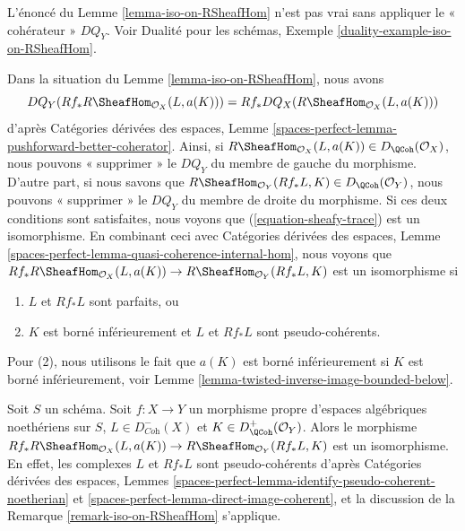 \begin{example}
\label{example-iso-on-RSheafHom}
L'énoncé du Lemme \ref{lemma-iso-on-RSheafHom} n'est pas vrai sans
appliquer le « cohérateur » $DQ_Y$. Voir
Dualité pour les schémas, Exemple \ref{duality-example-iso-on-RSheafHom}.
\end{example}

\begin{remark}
\label{remark-iso-on-RSheafHom}
Dans la situation du Lemme \ref{lemma-iso-on-RSheafHom}, nous avons
$$
DQ_Y(Rf_*R\SheafHom_{\mathcal{O}_X}(L, a(K))) =
Rf_* DQ_X(R\SheafHom_{\mathcal{O}_X}(L, a(K)))
$$
d'après Catégories dérivées des espaces, Lemme
\ref{spaces-perfect-lemma-pushforward-better-coherator}.
Ainsi, si $R\SheafHom_{\mathcal{O}_X}(L, a(K)) \in D_\QCoh(\mathcal{O}_X)$,
nous pouvons « supprimer » le $DQ_Y$ du membre de gauche du morphisme.
D'autre part, si nous savons que
$R\SheafHom_{\mathcal{O}_Y}(Rf_*L, K) \in D_\QCoh(\mathcal{O}_Y)$,
nous pouvons « supprimer » le $DQ_Y$ du membre de droite du morphisme.
Si ces deux conditions sont satisfaites, nous voyons que (\ref{equation-sheafy-trace})
est un isomorphisme. En combinant ceci avec
Catégories dérivées des espaces, Lemme
\ref{spaces-perfect-lemma-quasi-coherence-internal-hom},
nous voyons que $Rf_*R\SheafHom_{\mathcal{O}_X}(L, a(K)) \to
R\SheafHom_{\mathcal{O}_Y}(Rf_*L, K)$ est un isomorphisme si
\begin{enumerate}
\item $L$ et $Rf_*L$ sont parfaits, ou
\item $K$ est borné inférieurement et $L$ et $Rf_*L$ sont pseudo-cohérents.
\end{enumerate}
Pour (2), nous utilisons le fait que $a(K)$ est borné inférieurement si $K$
est borné inférieurement, voir Lemme \ref{lemma-twisted-inverse-image-bounded-below}.
\end{remark}

\begin{example}
\label{example-iso-on-RSheafHom-noetherian}
Soit $S$ un schéma.
Soit $f : X \to Y$ un morphisme propre d'espaces algébriques noethériens
sur $S$, $L \in D^-_{\textit{Coh}}(X)$ et $K \in D^+_{\QCoh}(\mathcal{O}_Y)$.
Alors le morphisme $Rf_*R\SheafHom_{\mathcal{O}_X}(L, a(K)) \to
R\SheafHom_{\mathcal{O}_Y}(Rf_*L, K)$ est un isomorphisme.
En effet, les complexes $L$ et $Rf_*L$ sont pseudo-cohérents d'après
Catégories dérivées des espaces, Lemmes
\ref{spaces-perfect-lemma-identify-pseudo-coherent-noetherian} et
\ref{spaces-perfect-lemma-direct-image-coherent},
et la discussion de la Remarque \ref{remark-iso-on-RSheafHom} s'applique.
\end{example}

